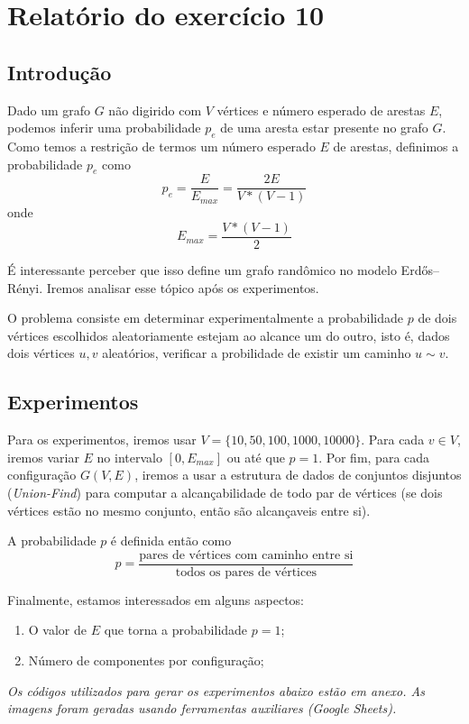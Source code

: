 \documentclass[12pt,letterpaper]{article}
\begin{document}
\section {Relatório do exercício 10}

\subsection {Introdução}
Dado um grafo $G$ não digirido com $V$ vértices e número esperado de arestas $E$, podemos inferir uma probabilidade $p_e$ de uma aresta estar presente no grafo $G$.
Como temos a restrição de termos um número esperado $E$ de arestas, definimos a probabilidade $p_e$ como
$$ p_e = \frac{E}{E_{max}} = \frac{2E}{V * (V-1)} $$
onde
$$ E_{max} = \frac{V * (V-1)}{2} $$

É interessante perceber que isso define um grafo randômico no modelo Erdős–Rényi. Iremos analisar esse tópico após os experimentos.

O problema consiste em determinar experimentalmente a probabilidade $p$ de dois vértices escolhidos aleatoriamente estejam ao alcance um do outro, isto é, dados dois vértices $u, v$ aleatórios, verificar a probilidade de existir um caminho $u \sim v$.

\subsection {Experimentos}
Para os experimentos, iremos usar $V = \{ 10, 50, 100, 1000, 10000 \}$. Para cada $v \in V$, iremos variar $E$ no intervalo $[0, E_{max}]$ ou até que $p = 1$.
Por fim, para cada configuração $G(V, E)$, iremos a usar a estrutura de dados de conjuntos disjuntos (\textit{Union-Find}) para computar a alcançabilidade de todo par de vértices (se dois vértices estão no mesmo conjunto, então são alcançaveis entre si).

A probabilidade $p$ é definida então como
$$ p = \frac{\text{pares de vértices com caminho entre si}}{\text{todos os pares de vértices}} $$

Finalmente, estamos interessados em alguns aspectos:
\begin{enumerate}
    \item O valor de $E$ que torna a probabilidade $p = 1$;
    \item Número de componentes por configuração;
\end{enumerate}

\textit{Os códigos utilizados para gerar os experimentos abaixo estão em anexo. As imagens foram geradas usando ferramentas auxiliares (Google Sheets).}
\end{document}
